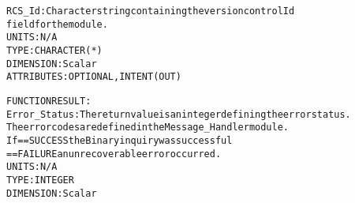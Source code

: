 \begin{alltt}
        RCS_Id:       Character string containing the version control Id
                      field for the module.
                      UNITS:      N/A
                      TYPE:       CHARACTER(*)
                      DIMENSION:  Scalar
                      ATTRIBUTES: OPTIONAL, INTENT(OUT)
 
  FUNCTION RESULT:
        Error_Status: The return value is an integer defining the error status.
                      The error codes are defined in the Message_Handler module.
                      If == SUCCESS the Binary inquiry was successful
                         == FAILURE an unrecoverable error occurred.
                      UNITS:      N/A
                      TYPE:       INTEGER
                      DIMENSION:  Scalar
 
  \end{alltt}
